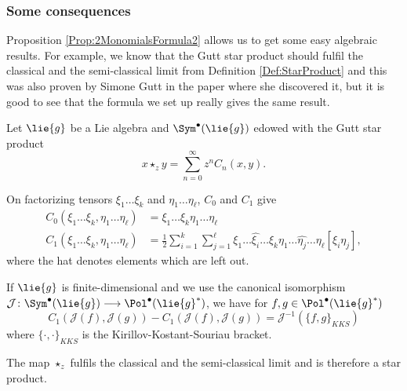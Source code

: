\subsubsection*{Some consequences}
Proposition \ref{Prop:2MonomialsFormula2} allows us to get some easy 
algebraic results. For example, we know that the Gutt star product should 
fulfil the classical and the semi-classical limit from Definition 
\ref{Def:StarProduct} and this was also proven by Simone Gutt in the paper 
\cite{Gutt:83-Gst} where she discovered it, but it is good to see that the 
formula we set up really gives the same result.

\begin{corollary}
	\label{Formulas:Cor:LimitCases}
	Let $\lie{g}$ be a Lie algebra and $\Sym^{\bullet}(\lie{g})$ edowed with 
	the Gutt star product
	\begin{equation*}
		x \star_z y
		= 
		\sum\limits_{n = 0}^{\infty}
		z^n C_n(x,y).
	\end{equation*}	
	\begin{corollarylist}
		\item
		On factorizing tensors $\xi_1 \ldots \xi_k$ and $\eta_1 \ldots 
		\eta_{\ell}$, $C_0$ and $C_1$ give
		\begin{align}
			\label{Formulas:ClassicalLimit}
			C_0 \left(
				\xi_1 \ldots \xi_k, \eta_1 \ldots \eta_{\ell}
			\right)
			& = 
			\xi_1 \ldots \xi_k \eta_1 \ldots \eta_{\ell}
			\\
			\label{Formulas:SemiClassicalLimit}
			C_1 \left(
				\xi_1 \ldots \xi_k, \eta_1 \ldots \eta_{\ell}
			\right)
				& =
			\frac{1}{2}	
			\sum\limits_{i = 1}^k
			\sum\limits_{j = 1}^{\ell}
			\xi_1 \ldots \widehat{\xi_i} \ldots \xi_k
			\eta_1 \ldots \widehat{\eta_j} \ldots \eta_{\ell}
			[\xi_i \eta_j],
		\end{align}
		where the hat denotes elements which are left out.
		
		\item
		If $\lie{g}$ is finite-dimensional and we use the canonical 
		isomorphism $\mathcal{J} \colon \Sym^{\bullet}(\lie{g}) 
		\longrightarrow \Pol^{\bullet}(\lie{g}^*)$, we have for
		$f,g \in \Pol^{\bullet}(\lie{g}^*)$
		\begin{equation*}
			C_1 \left(
				\mathcal{J} (f),
				\mathcal{J} (g)
			\right)
			-
			C_1 \left(
				\mathcal{J} (f),
				\mathcal{J} (g)
			\right)
			= 
			\mathcal{J}^{-1} \left( 
				\{ f, g \}_{KKS}
			\right)
		\end{equation*}
		where $\{ \cdot, \cdot \}_{KKS}$ is the Kirillov-Kostant-Souriau 
		bracket.
		
		\item
		The map $\star_z$ fulfils the classical and the semi-classical limit 
		and is therefore a star product.
	\end{corollarylist}
\end{corollary}
